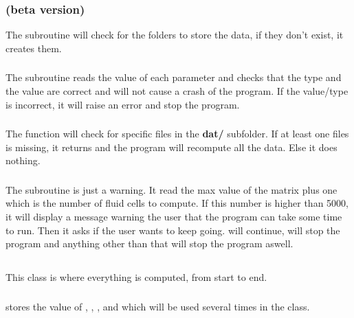 \subsubsection{\textcolor{func}{} (beta version)}
The subroutine \textcolor{func}{} will check for the
folders to store the data, if they don't exist, it creates them.

\subsubsection{\textcolor{func}{}}
The subroutine \textcolor{func}{} reads the value of each
parameter and checks that the type and the value are correct and will not cause
a crash of the program. If the value/type is incorrect, it will raise an error
and stop the program.

\subsubsection{\textcolor{func}{}}
The function \textcolor{func}{} will check for specific
files in the \textbf{dat/} subfolder. If at least one files is missing, it
returns  and the program will recompute all the data. Else it does
nothing.

\subsubsection{\textcolor{func}{}}
The subroutine \textcolor{func}{} is just a warning. It read the max value of
the matrix  plus one which is the number of fluid cells to compute.
If this number is higher than 5000, it will display a message warning the user
that the program can take some time to run. Then it asks if the user wants to
keep going.  will continue,  will stop the program and
anything other than that will stop the program aswell.

\subsection{}
This class is where everything is computed, from start to end.

\subsubsection{\textcolor{func}{}}
\textcolor{func}{} stores the value of , , ,  and
 which will be used several times in the class.


